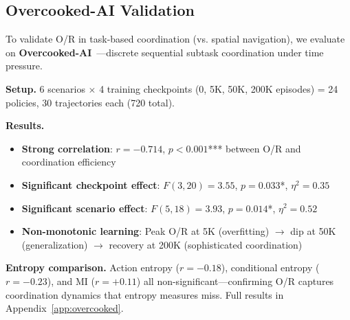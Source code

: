 
\subsection{Overcooked-AI Validation}
\label{sec:overcooked_validation}

To validate O/R in task-based coordination (vs. spatial navigation), we evaluate on \textbf{Overcooked-AI}~\citep{carroll2019utility}—discrete sequential subtask coordination under time pressure.

\textbf{Setup.} 6 scenarios $\times$ 4 training checkpoints (0, 5K, 50K, 200K episodes) = 24 policies, 30 trajectories each (720 total).

\textbf{Results.}
\begin{itemize}[nosep]
    \item \textbf{Strong correlation}: $r = -0.714$, $p < 0.001$*** between O/R and coordination efficiency
    \item \textbf{Significant checkpoint effect}: $F(3,20) = 3.55$, $p = 0.033$*, $\eta^2 = 0.35$
    \item \textbf{Significant scenario effect}: $F(5,18) = 3.93$, $p = 0.014$*, $\eta^2 = 0.52$
    \item \textbf{Non-monotonic learning}: Peak O/R at 5K (overfitting) $\to$ dip at 50K (generalization) $\to$ recovery at 200K (sophisticated coordination)
\end{itemize}

\textbf{Entropy comparison.} Action entropy ($r = -0.18$), conditional entropy ($r = -0.23$), and MI ($r = +0.11$) all non-significant—confirming O/R captures coordination dynamics that entropy measures miss. Full results in Appendix~\ref{app:overcooked}.
